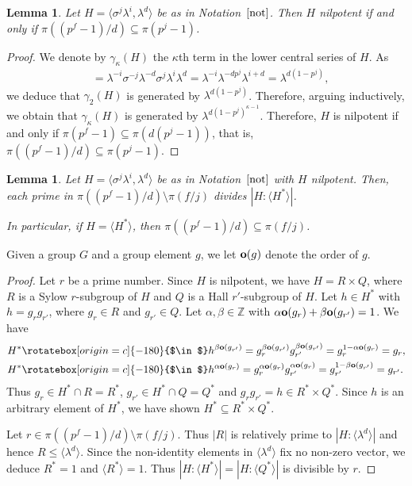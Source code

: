 \documentclass{amsart}
\newcommand*{\backin}{\rotatebox[origin=c]{-180}{$\in$}}
\newtheorem{lemma}[theorem]{Lemma}
\begin{document}
\begin{lemma}\label{lemma:mercoledi3}
Let $H=\langle \sigma^j\lambda^i,\lambda^d\rangle$ be as in Notation~$\ref{not}$. Then $H$ nilpotent if and only if $\pi((p^f-1)/d)\subseteq \pi(p^j-1)$.
\end{lemma}
\begin{proof}
We denote by $\gamma_\kappa(H)$ the $\kappa$th term in the lower central series of $H$. As 
\begin{align*}
[\sigma^j\lambda^i,\lambda^d]&=
\lambda^{-i}\sigma^{-j}\lambda^{-d}\sigma^j\lambda^i\lambda^d=
\lambda^{-i}\lambda^{-dp^j}\lambda^{i+d}=
\lambda^{d(1-p^j)},
\end{align*} we deduce that $\gamma_2(H)$ is generated by $\lambda^{d(1-p^j)}$. Therefore, arguing inductively, we obtain that $\gamma_{\kappa}(H)$ is generated by $\lambda^{d(1-p^j)^{\kappa-1}}$. Therefore, $H$ is nilpotent if and only if $\pi(p^f-1)\subseteq \pi(d(p^j-1))$, that is, $\pi((p^f-1)/d)\subseteq\pi(p^j-1)$.\end{proof}

\begin{lemma}\label{lemma:mercoledi33}
Let $H=\langle \sigma^j\lambda^i,\lambda^d\rangle$ be as in Notation~$\ref{not}$ with $H$ nilpotent. Then, each prime in $\pi((p^f-1)/d)\setminus\pi(f/j)$ divides $|H:\langle H^\ast\rangle|$.

In particular, if $H=\langle H^\ast\rangle$, then $\pi((p^f-1)/d)\subseteq \pi(f/j)$.
\end{lemma}
Given a group $G$ and a group element $g$, we let ${\bf o}(g)$ denote the order of $g$. 
\begin{proof}
Let $r$ be a prime number. Since $H$ is nilpotent, we have $H=R\times Q$, where $R$ is a Sylow $r$-subgroup of $H$ and $Q$ is a Hall $r'$-subgroup of $H$. Let $h\in H^\ast$ with $h=g_rg_{r'}$, where $g_r\in R$ and $g_{r'}\in Q$. Let $\alpha,\beta\in\mathbb{Z}$ with $\alpha{\bf o}(g_r)+\beta{\bf o}(g_{r'})=1$. We have
\begin{align*}
H^\ast\backin& h^{\beta{\bf o}(g_{r'})}=g_r^{\beta{\bf o}(g_{r'})}g_{r'}^{\beta{\bf o}(g_{r'})}=g_r^{1-\alpha{\bf o}(g_r)}=g_r,\\
H^\ast\backin& h^{\alpha{\bf o}(g_{r})}=g_r^{\alpha{\bf o}(g_{r})}g_{r'}^{\alpha{\bf o}(g_{r})}=g_{r'}^{1-\beta{\bf o}(g_{r'})}=g_{r'}.
\end{align*}
Thus $g_r\in H^\ast\cap R=R^\ast$, $g_{r'}\in H^\ast\cap Q=Q^\ast$ and $g_rg_{r'}=h\in R^\ast\times Q^\ast$. Since $h$ is an arbitrary element of $H^\ast$, we have shown $H^\ast\subseteq R^\ast\times Q^\ast$.

Let $r\in\pi((p^f-1)/d)\setminus\pi(f/j)$. Thus $|R|$ is relatively prime to $|H:\langle \lambda^d\rangle|$ and hence $R\le\langle\lambda^d\rangle$. Since the non-identity elements in $\langle\lambda^d\rangle$ fix no non-zero vector, we deduce $R^\ast=1$ and $\langle R^\ast\rangle=1$. Thus $|H:\langle H^\ast\rangle|=|H:\langle Q^\ast\rangle|$ is divisible by $r$.
\end{proof}
\end{document}
